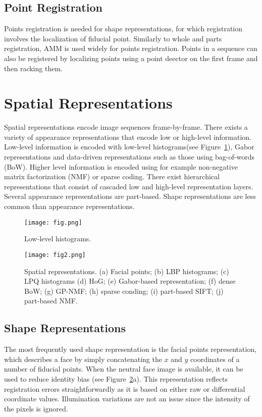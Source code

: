 \documentclass[10pt,twocolumn,letterpaper]{article}
\begin{document}
	\subsection*{Point Registration}
	Points registration is needed for shape representations, for which registration involves the localization of fiducial point. Similarly to whole and parts registration, AMM is used widely for points registration. Points in a sequence can also be registered by localizing points using a point deector on the first frame and then racking them.
	\section*{Spatial Representations}
	Spatial representations encode image sequences frame-by-frame. There exists a variety of appearance representations that encode low or high-level information. Low-level information is encoded with low-level histograms(see Figure~\ref{fig1}), Gabor representations and data-driven representations such as those using bag-of-words (BoW). Higher level information is encoded using for example non-negative matrix factorization (NMF) or sparse coding. There exist hierarchical representations that consist of cascaded low and high-level representation layers. Several appearance representations are part-based. Shape representations are less common than appearance representations.
	\begin{figure}[h]
		\centering
		\texttt{[image: fig.png]}
		\caption{Low-level histograms.} \label{fig1}
	\end{figure}
	\begin{figure}[h]
		\centering
		\texttt{[image: fig2.png]}
		\caption{Spatial representations. (a) Facial points; (b) LBP histograms; (c) LPQ histograms (d) HoG; (e) Gabor-based representation; (f) dense BoW; (g) GP-NMF; (h) sparse conding; (i) part-based SIFT; (j) part-based NMF.} \label{fig2}
	\end{figure}
	\subsection*{Shape Representations}
	The most frequently used shape representation is the facial points representation, which describes a face by simply concatenating the $x$ and $y$ coordinates of a number of fiducial points. When the neutral face image is available, it can be used to reduce identity bias (see Figure~\ref{fig2}a). This representation reflects registration errors straightforwardly as it is based on either raw or differential coordinate values. Illumination variations are not an issue since the intensity of the pixels is ignored.
\end{document}
